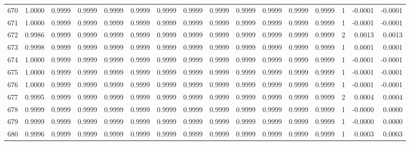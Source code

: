 \begin{tabular}{lrrrrrrrrrrrrrrr}
670 &      1.0000 &  0.9999 &  0.9999 &  0.9999 &  0.9999 &  0.9999 &  0.9999 &  0.9999 &  0.9999 &  0.9999 &   0.9999 &     0.9999 &      1 &                   -0.0001 &                    -0.0001 \\
671 &      1.0000 &  0.9999 &  0.9999 &  0.9999 &  0.9999 &  0.9999 &  0.9999 &  0.9999 &  0.9999 &  0.9999 &   0.9999 &     0.9999 &      1 &                   -0.0001 &                    -0.0001 \\
672 &      0.9986 &  0.9999 &  0.9999 &  0.9999 &  0.9999 &  0.9999 &  0.9999 &  0.9999 &  0.9999 &  0.9999 &   0.9999 &     0.9999 &      2 &                    0.0013 &                     0.0013 \\
673 &      0.9998 &  0.9999 &  0.9999 &  0.9999 &  0.9999 &  0.9999 &  0.9999 &  0.9999 &  0.9999 &  0.9999 &   0.9999 &     0.9999 &      1 &                    0.0001 &                     0.0001 \\
674 &      1.0000 &  0.9999 &  0.9999 &  0.9999 &  0.9999 &  0.9999 &  0.9999 &  0.9999 &  0.9999 &  0.9999 &   0.9999 &     0.9999 &      1 &                   -0.0001 &                    -0.0001 \\
675 &      1.0000 &  0.9999 &  0.9999 &  0.9999 &  0.9999 &  0.9999 &  0.9999 &  0.9999 &  0.9999 &  0.9999 &   0.9999 &     0.9999 &      1 &                   -0.0001 &                    -0.0001 \\
676 &      1.0000 &  0.9999 &  0.9999 &  0.9999 &  0.9999 &  0.9999 &  0.9999 &  0.9999 &  0.9999 &  0.9999 &   0.9999 &     0.9999 &      1 &                   -0.0001 &                    -0.0001 \\
677 &      0.9995 &  0.9999 &  0.9999 &  0.9999 &  0.9999 &  0.9999 &  0.9999 &  0.9999 &  0.9999 &  0.9999 &   0.9999 &     0.9999 &      2 &                    0.0004 &                     0.0004 \\
678 &      0.9999 &  0.9999 &  0.9999 &  0.9999 &  0.9999 &  0.9999 &  0.9999 &  0.9999 &  0.9999 &  0.9999 &   0.9999 &     0.9999 &      1 &                   -0.0000 &                     0.0000 \\
679 &      0.9999 &  0.9999 &  0.9999 &  0.9999 &  0.9999 &  0.9999 &  0.9999 &  0.9999 &  0.9999 &  0.9999 &   0.9999 &     0.9999 &      1 &                   -0.0000 &                     0.0000 \\
680 &      0.9996 &  0.9999 &  0.9999 &  0.9999 &  0.9999 &  0.9999 &  0.9999 &  0.9999 &  0.9999 &  0.9999 &   0.9999 &     0.9999 &      1 &                    0.0003 &                     0.0003 \\

\end{tabular}
